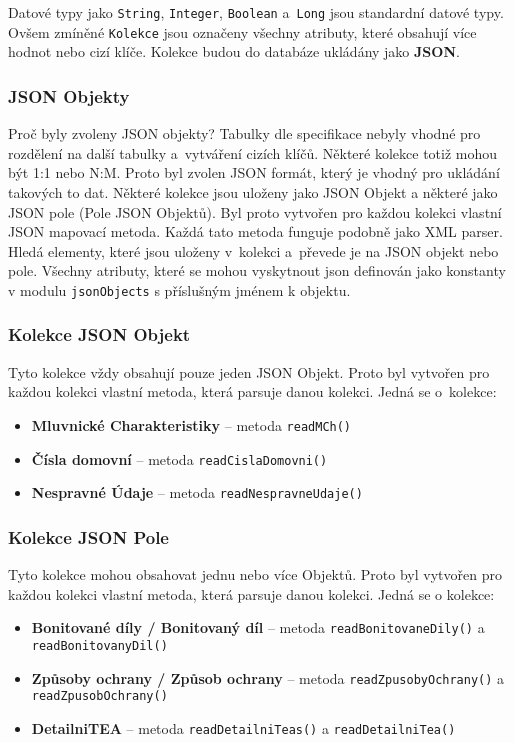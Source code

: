 Datové typy jako \texttt{String}, \texttt{Integer}, \texttt{Boolean} a~\texttt{Long} jsou standardní datové typy.
Ovšem zmíněné \texttt{Kolekce} jsou označeny všechny atributy, které obsahují více hodnot nebo cizí klíče.
Kolekce budou do databáze ukládány jako \textbf{JSON}.

\subsubsection*{JSON Objekty}
Proč byly zvoleny JSON objekty? Tabulky dle specifikace nebyly vhodné pro rozdělení na další tabulky a~vytváření cizích klíčů.
Některé kolekce totiž mohou být 1:1 nebo N:M. Proto byl zvolen JSON formát, který je vhodný pro ukládání takových to dat.
Některé kolekce jsou uloženy jako JSON Objekt a některé jako JSON pole (Pole JSON Objektů).
Byl proto vytvořen pro každou kolekci vlastní JSON mapovací metoda. Každá tato metoda funguje podobně jako XML parser.
Hledá elementy, které jsou uloženy v~kolekci a~převede je na JSON objekt nebo pole.
Všechny atributy, které se mohou vyskytnout json definován jako konstanty v modulu \texttt{jsonObjects} s příslušným jménem k objektu.

\subsubsection*{Kolekce JSON Objekt}
Tyto kolekce vždy obsahují pouze jeden JSON Objekt.
Proto byl vytvořen pro každou kolekci vlastní metoda, která parsuje danou kolekci.
Jedná se o~kolekce:
\begin{itemize}
    \item \textbf{Mluvnické Charakteristiky} -- metoda \texttt{readMCh()}
    \item \textbf{Čísla domovní} -- metoda \texttt{readCislaDomovni()}
    \item \textbf{Nespravné Údaje} -- metoda \texttt{readNespravneUdaje()}
\end{itemize}

\subsubsection*{Kolekce JSON Pole}
Tyto kolekce mohou obsahovat jednu nebo více Objektů.
Proto byl vytvořen pro každou kolekci vlastní metoda, která parsuje danou kolekci.
Jedná se o kolekce:
\begin{itemize}
    \item \textbf{Bonitované díly / Bonitovaný díl} -- metoda \texttt{readBonitovaneDily()} a \texttt{readBonitovanyDil()}
    \item \textbf{Způsoby ochrany / Způsob ochrany} -- metoda \texttt{readZpusobyOchrany()} a \texttt{readZpusobOchrany()}
    \item \textbf{DetailniTEA} -- metoda \texttt{readDetailniTeas()} a \texttt{readDetailniTea()}
\end{itemize}


